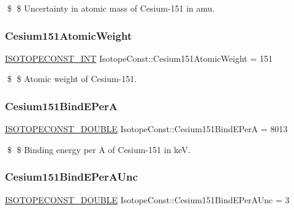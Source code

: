 \$ \$ Uncertainty in atomic mass of Cesium-\/151 in amu. \mbox{\label{group___isotope_const-_cesium-_cs151_gad7c56b02a8d6fdda0a9befdcb9afc032}} 
\subsubsection{\texorpdfstring{Cesium151\+Atomic\+Weight}{Cesium151AtomicWeight}}
{\footnotesize\ttfamily \mbox{\hyperlink{group___isotope_const-_macros_ga5f18360b3e99483a35c32d789e62621c}{I\+S\+O\+T\+O\+P\+E\+C\+O\+N\+S\+T\+\_\+\+I\+NT}} Isotope\+Const\+::\+Cesium151\+Atomic\+Weight = 151}

\$ \$ Atomic weight of Cesium-\/151. \mbox{\label{group___isotope_const-_cesium-_cs151_gac76041f145bae2b00cb607f51c2621ef}} 
\subsubsection{\texorpdfstring{Cesium151\+Bind\+E\+PerA}{Cesium151BindEPerA}}
{\footnotesize\ttfamily \mbox{\hyperlink{group___isotope_const-_macros_ga8f45a7272ce02c0b4c65c44636ed719a}{I\+S\+O\+T\+O\+P\+E\+C\+O\+N\+S\+T\+\_\+\+D\+O\+U\+B\+LE}} Isotope\+Const\+::\+Cesium151\+Bind\+E\+PerA = 8013}

\$ \$ Binding energy per A of Cesium-\/151 in keV. \mbox{\label{group___isotope_const-_cesium-_cs151_ga6ac15e3e7672c8be5c7bc5ae17f28a32}} 
\subsubsection{\texorpdfstring{Cesium151\+Bind\+E\+Per\+A\+Unc}{Cesium151BindEPerAUnc}}
{\footnotesize\ttfamily \mbox{\hyperlink{group___isotope_const-_macros_ga8f45a7272ce02c0b4c65c44636ed719a}{I\+S\+O\+T\+O\+P\+E\+C\+O\+N\+S\+T\+\_\+\+D\+O\+U\+B\+LE}} Isotope\+Const\+::\+Cesium151\+Bind\+E\+Per\+A\+Unc = 3}

